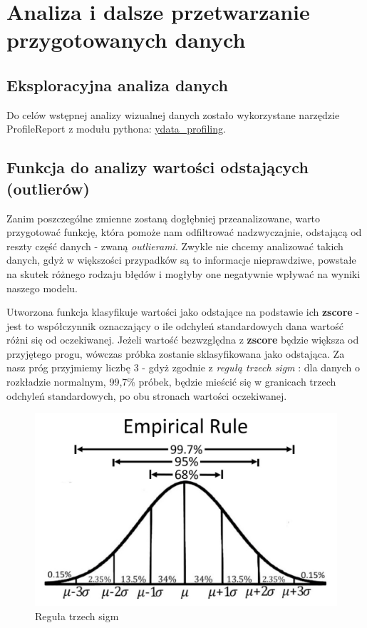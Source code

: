 \documentclass{article}
\begin{document}
\section{Analiza i dalsze przetwarzanie przygotowanych danych}

\subsection{Eksploracyjna analiza danych}
Do celów wstępnej analizy wizualnej danych zostało wykorzystane narzędzie ProfileReport z modułu pythona: \href{https://pypi.org/project/ydata-profiling/}{ydata\_profiling}.

\subsection{Funkcja do analizy wartości odstających (outlierów)}\label{subsec:outlier_func}
Zanim poszczególne zmienne zostaną dogłębniej przeanalizowane, warto przygotować funkcję, która pomoże nam odfiltrować nadzwyczajnie, odstającą od reszty część danych - zwaną \textit{outlierami}. Zwykle nie chcemy analizować takich danych, gdyż w większości przypadków są to informacje nieprawdziwe, powstałe na skutek różnego rodzaju błędów i mogłyby one negatywnie wpływać na wyniki naszego modelu.
 
Utworzona funkcja klasyfikuje wartości jako odstające na podstawie ich \textbf{zscore} - jest to współczynnik oznaczający o ile odchyleń standardowych dana wartość różni się od oczekiwanej. Jeżeli wartość bezwzględna z \textbf{zscore} będzie większa od przyjętego progu, wówczas próbka zostanie sklasyfikowana jako odstająca. Za nasz próg przyjmiemy liczbę 3 - gdyż zgodnie z \textit{regułą trzech sigm} \cite{three_sigma_rule}: dla danych o rozkładzie normalnym, 99,7\% próbek, będzie mieścić się w granicach trzech odchyleń standardowych, po obu stronach wartości oczekiwanej.

\begin{figure}[H]
    \centering
    \includegraphics[width=0.75\linewidth]{images/regula_trzech_sigm.jpg}
    \caption{Reguła trzech sigm}
    \label{plt:three_sigm_rule}
\end{figure}
\end{document}
